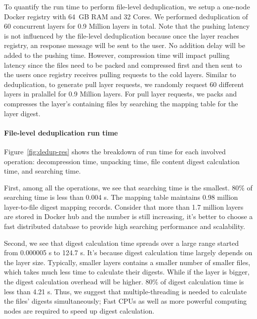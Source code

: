 To quantify the run time to perform file-level deduplication, we setup a
one-node Docker registry with 64~GB RAM and 32 Cores.  We performed
deduplication of 60 concurrent layers for 0.9 Million layers in total.
%
%
Note that the pushing latency is not influenced by the file-level deduplication
because once the layer reaches registry, an response message will be sent to
the user. No addition delay will be added to the pushing time. However,
compression time will impact pulling latency since the files need to be packed
and compressed first and then sent to the users once registry receives pulling
requests to the cold layers. Similar to deduplication, to generate pull layer
requests, we randomly request 60 different layers in pralallel for 0.9 Million
layers. For pull layer requests, we packs and compresses the layer's containing
files by searching the mapping table for the layer digest. 

\paragraph{File-level deduplication run time}

%
Figure~\ref{fig:dedup-res} shows the breakdown of run time for each
involved operation: decompression time, unpacking time, file content digest
calculation time, and searching time.

First, among all the operations, we see that searching time is the
smallest. 80\% of searching time is less than 0.004 s. The mapping table
maintains 0.98 million layer-to-file digest mapping records. Consider that more
than 1.7 million layers are stored in Docker hub and the number is still
increasing, it's better to choose a fast distributed database to provide high
searching performance and scalability.
%
  
Second, we see that digest calculation time spreads over a large range started
from 0.000005 s to 124.7 s. It's because digest calculation time largely
depends on the layer size. Typically, smaller layers contains a smaller number
of smaller files, which takes much less time to calculate their digests. While
if the layer is bigger, the digest calculation overhead will be higher. 80\% of
digest calculation time is less than 4.21 s. 
Thus, we suggest that multiple-threading is needed to calculate the files'
digests simultaneously; Fast CPUs as well as more powerful computing nodes are
required to speed up digest calculation.

